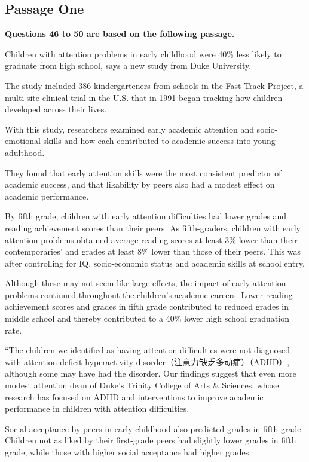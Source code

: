 \documentclass[UTF8,11pt]{ctexart}
\begin{document}
\subsection*{\textbf{Passage One}}


\textbf{Questions 46 to 50 are based on the following passage.}


Children with attention problems in early childhood were 40\% less likely to graduate from high school, says a new study from Duke University.


The study included 386 kindergarteners from schools in the Fast Track Project, a multi-site clinical trial in the U.S. that in 1991 began tracking how children developed across their lives.


With this study, researchers examined early academic attention and socio-emotional skills and how each contributed to academic success into young adulthood.


They found that early attention skills were the most consistent predictor of academic success, and that likability by peers also had a modest effect on academic performance.


By fifth grade, children with early attention difficulties had lower grades and reading achievement scores than their peers. As fifth-graders, children with early attention problems obtained average reading scores at least 3\% lower than their contemporaries’ and grades at least 8\% lower than those of their peers. This was after controlling for IQ, socio-economic status and academic skills at school entry.


Although these may not seem like large effects, the impact of early attention problems continued throughout the children’s academic careers. Lower reading achievement scores and grades in fifth grade contributed to reduced grades in middle school and thereby contributed to a 40\% lower high school graduation rate.


“The children we identified as having attention difficulties were not diagnosed with attention deficit hyperactivity disorder（注意力缺乏多动症）（ADHD）, although some may have had the disorder. Our findings suggest that even more modest attention dean of Duke’s Trinity College of Arts \& Sciences, whose research has focused on ADHD and interventions to improve academic performance in children with attention difficulties.


Social acceptance by peers in early childhood also predicted grades in fifth grade. Children not as liked by their first-grade peers had slightly lower grades in fifth grade, while those with higher social acceptance had higher grades.
\end{document}
